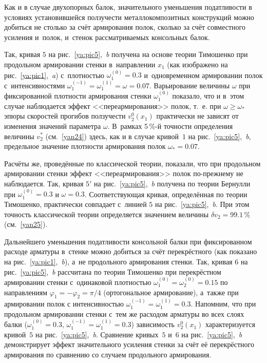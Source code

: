 Как и в случае двухопорных балок, значительного уменьшения податливости в условиях установившейся ползучести металлокомпозитных конструкций можно добиться не столько за счёт армирования полок, сколько за счёт совместного усиления и~полок, и~стенок рассматриваемых консольных балок.

Так, кривая $5$ на рис.~\ref{ya:pic5},~{\sl b} получена на основе теории Тимошенко при продольном армировании стенки в~направлении $x_1$ (как изображено на рис.~\ref{ya:pic1},~{\sl a}) 
с~плотностью $\omega_1^{(0)}=0.3$ и~одновременном армировании полок с~интенсивностями $\omega_1^{(-1)}=\omega_1^{(1)}=\omega=0.07$. 
Варьирование величины $\omega$ при фиксированной плотности армирования стенки $\omega_1^{(0)}$ показало, что и в~этом случае наблюдается эффект <<переармирования>> полок, 
т.~е. при $\omega\ge\omega_*$ эпюры скоростей прогибов ползучести $v_2^0(x_1)$ практически не зависят от изменения значений параметра $\omega$. 
В~рамках 5\,\%-й точности определения величины $v_2^*$ (см.~\eqref{yan24}) здесь, как и в случае кривой~$1$ на рис.~\ref{ya:pic5},~{\sl b}, предельное значение плотности армирования полок $\omega_*=0.07$.

Расчёты же, проведённые по классической теории, показали, что при продольном армировании стенки эффект <<переармирования>> полок по-прежнему не наблюдается. 
Так, кривая $5'$ на рис.~\ref{ya:pic5},~{\sl b} получена по теории Бернулли при $\omega_1^{(0)}=0.3$ и $\omega=0.3$. Соответствующая кривая, определённая по теории Тимошенко, 
практически совпадает с~линией $5$ на рис.~\ref{ya:pic5},~{\sl b}. 
При этом точность классической теории определяется значением величины $\delta v_2=99.1\,\%$ (см.~\eqref{yan25}).

Дальнейшего уменьшения податливости консольной балки при фиксированном расходе арматуры в~стенке можно добиться за счёт перекрёстного (как показано на рис.~\ref{ya:pic1},~{\sl b}), а~не продольного армирования стенки. 
Так, кривая $6$ на рис.~\ref{ya:pic5},~{\sl b} рассчитана по теории Тимошенко при перекрёстном армировании стенки с~одинаковой плотностью $\omega_1^{(0)}=\omega_2^{(0)}=0.15$ по направлениям 
$\varphi_1=-\varphi_2=\pi/4$ (ортогональное армирование), 
а~также при армировании полок с интенсивностью $\omega_1^{(-1)}=\omega_1^{(1)}=0.3$. 
Напомним, что при продольном армировании стенки с~тем же расходом арматуры во всех слоях балки ($\omega_1^{(0)}=0.3$,
$\omega_1^{(-1)}=\omega_1^{(1)}=0.3$) 
зависимость $v_2^0(x_1)$ характеризуется кривой~$5$ на рис.~\ref{ya:pic5},~{\sl b}. 
Сравнение кривых~$5$ и~$6$ на рис.~\ref{ya:pic5},~{\sl b} демонстрирует эффект значительного усиления стенки за счёт её перекрёстного армирования по сравнению со случаем продольного армирования.


